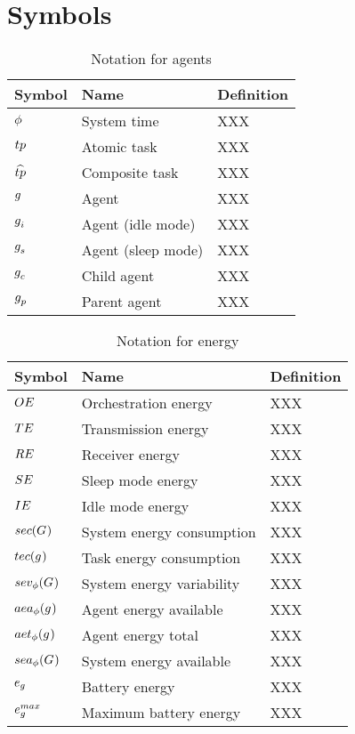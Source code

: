 \section{Symbols}

\begin{table}[pos=htp]
	\begin{tabular}{|p{}|p{}|p{}|}
		\hline
		Symbol & Name & Definition \\
		\hline
		$\phi$ & System time & XXX \\
		$\varAtomicTask{}{}$ & Atomic task & XXX \\
		$\varCompositeTask{}{}$ & Composite task & XXX \\
		$g_{}^{}$ & Agent & XXX \\
		$g_{i}^{}$ & Agent (idle mode) & XXX \\
		$g_{s}^{}$ & Agent (sleep mode) & XXX \\
		$g_{c}^{}$ & Child agent & XXX \\
		$g_{p}^{}$ & Parent agent & XXX \\
		\hline
	\end{tabular}
	\caption{Notation for agents}
\end{table}

\begin{table}[pos=htp]
	\begin{tabular}{|p{}|p{}|p{}|}
		\hline
		Symbol & Name & Definition \\
		\hline
		$OE$ & Orchestration energy & XXX \\
		$TE$ & Transmission energy & XXX \\
		$RE$ & Receiver energy & XXX \\
		$SE$ & Sleep mode energy & XXX \\
		$IE$ & Idle mode energy & XXX \\
		$\functionSystemEnergyConsumption{}{}$ & System energy consumption& XXX \\
		$\functionTaskEnergy{}{}$ & Task energy consumption & XXX \\
		$\functionSystemEnergyVariability{}{}$ & System energy variability& XXX \\
		$\functionAgentEnergyAvailable{}{}$ & Agent energy available & XXX \\
		$\functionAgentEnergyTotal{}{}$ & Agent energy total & XXX \\
		$\functionSystemEnergyAvailable{}{}$ & System energy available & XXX \\
		$\varBatteryEnergy{}{}$ & Battery energy & XXX \\
		$\varBatteryEnergyMax{}{}$ & Maximum battery energy & XXX \\
		\hline
	\end{tabular}
	\caption{Notation for energy}
\end{table}

